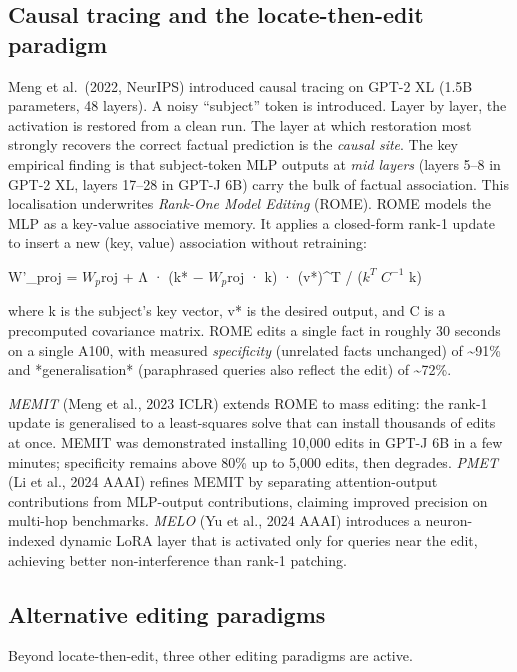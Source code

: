 \subsection{Causal tracing and the locate-then-edit paradigm}\label{causal-tracing-and-the-locate-then-edit-paradigm}

Meng et al.~(2022, NeurIPS) introduced causal tracing on GPT-2 XL (1.5B parameters, 48 layers). A noisy ``subject'' token is introduced. Layer by layer, the activation is restored from a clean run. The layer at which restoration most strongly recovers the correct factual prediction is the \emph{causal site}. The key empirical finding is that subject-token MLP outputs at \emph{mid layers} (layers 5--8 in GPT-2 XL, layers 17--28 in GPT-J 6B) carry the bulk of factual association. This localisation underwrites \emph{Rank-One Model Editing} (ROME). ROME models the MLP as a key-value associative memory. It applies a closed-form rank-1 update to insert a new (key, value) association without retraining:

W'\_proj = \(W_p\)roj + Λ · (k* − \(W_p\)roj · k) · (v*)\^{}T / (\(k^T\) \(C^{-1}\) k)

where k is the subject's key vector, v* is the desired output, and C is a precomputed covariance matrix. ROME edits a single fact in roughly 30 seconds on a single A100, with measured \emph{specificity} (unrelated facts unchanged) of \textasciitilde91\% and *generalisation* (paraphrased queries also reflect the edit) of \textasciitilde72\%.

\emph{MEMIT} (Meng et al., 2023 ICLR) extends ROME to mass editing: the rank-1 update is generalised to a least-squares solve that can install thousands of edits at once. MEMIT was demonstrated installing 10,000 edits in GPT-J 6B in a few minutes; specificity remains above 80\% up to 5,000 edits, then degrades. \emph{PMET} (Li et al., 2024 AAAI) refines MEMIT by separating attention-output contributions from MLP-output contributions, claiming improved precision on multi-hop benchmarks. \emph{MELO} (Yu et al., 2024 AAAI) introduces a neuron-indexed dynamic LoRA layer that is activated only for queries near the edit, achieving better non-interference than rank-1 patching.

\subsection{Alternative editing paradigms}\label{alternative-editing-paradigms}

Beyond locate-then-edit, three other editing paradigms are active.

